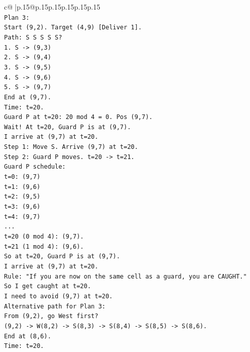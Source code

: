 \documentclass{article}
\begin{document}
{\begin{supertabular}{c@{$\;$}|p{.15\linewidth}@{}p{.15\linewidth}p{.15\linewidth}p{.15\linewidth}p{.15\linewidth}p{.15\linewidth}}
{{{\\ 
\texttt{Plan 3:} \\
\texttt{Start (9,2). Target (4,9) {[}Deliver 1{]}.} \\
\texttt{Path: S S S S S?} \\
\texttt{1. S {-}> (9,3)} \\
\texttt{2. S {-}> (9,4)} \\
\texttt{3. S {-}> (9,5)} \\
\texttt{4. S {-}> (9,6)} \\
\texttt{5. S {-}> (9,7)} \\
\texttt{End at (9,7).} \\
\texttt{Time: t=20.} \\
\texttt{Guard P at t=20: 20 mod 4 = 0. Pos (9,7).} \\
\texttt{Wait! At t=20, Guard P is at (9,7).} \\
\texttt{I arrive at (9,7) at t=20.} \\
\texttt{Step 1: Move S. Arrive (9,7) at t=20.} \\
\texttt{Step 2: Guard P moves. t=20 {-}> t=21.} \\
\texttt{Guard P schedule:} \\
\texttt{t=0: (9,7)} \\
\texttt{t=1: (9,6)} \\
\texttt{t=2: (9,5)} \\
\texttt{t=3: (9,6)} \\
\texttt{t=4: (9,7)} \\
\texttt{...} \\
\texttt{t=20 (0 mod 4): (9,7).} \\
\texttt{t=21 (1 mod 4): (9,6).} \\
\texttt{So at t=20, Guard P is at (9,7).} \\
\texttt{I arrive at (9,7) at t=20.} \\
\texttt{Rule: "If you are now on the same cell as a guard, you are CAUGHT."} \\
\texttt{So I get caught at t=20.} \\
\texttt{I need to avoid (9,7) at t=20.} \\
\texttt{Alternative path for Plan 3:} \\
\texttt{From (9,2), go West first?} \\
\texttt{(9,2) {-}> W(8,2) {-}> S(8,3) {-}> S(8,4) {-}> S(8,5) {-}> S(8,6).} \\
\texttt{End at (8,6).} \\
\texttt{Time: t=20.} \\
}}}
\end{supertabular}}
\end{document}
